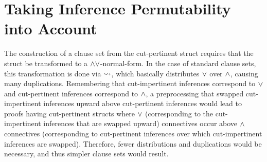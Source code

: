 \documentclass{llncs}
\begin{document}
\section{Taking Inference Permutability into Account}
\label{sec:InferencePermutability}

The construction of a clause set from the cut-pertinent struct requires that the struct be transformed to a $\wedge\vee$-normal-form. In the case of standard clause sets, this transformation is done via $\leadsto$, which basically distributes $\vee$ over $\wedge$, causing many duplications. Remembering that cut-impertinent inferences correspond to $\vee$ and cut-pertinent inferences correspond to $\wedge$, a preprocessing that swapped cut-impertinent inferences upward above cut-pertinent inferences would lead to proofs having cut-pertinent structs where $\vee$ (corresponding to the cut-impertinent inferences that are swapped upward) connectives occur above $\wedge$ connectives (corresponding to cut-pertinent inferences over which cut-impertinent inferences are swapped). Therefore, fewer distributions and duplications would be necessary, and thus simpler clause sets would result.
\end{document}
